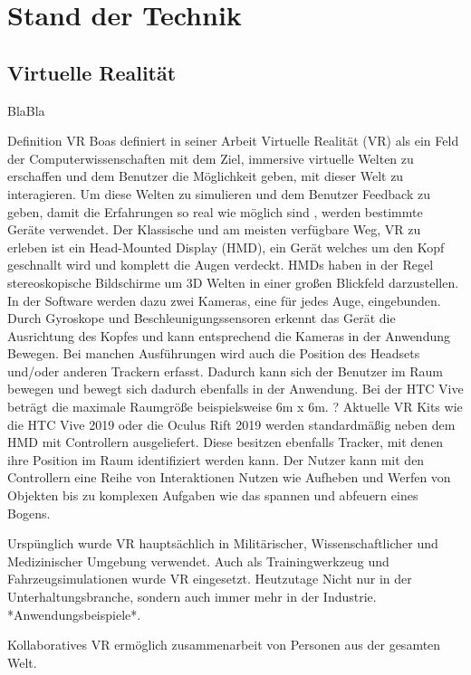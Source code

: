 \chapter{Stand der Technik}

\section{Virtuelle Realität}
BlaBla\cite{Dummer2009}

Definition VR
Boas definiert in  seiner Arbeit \cite{Boas2012} Virtuelle Realität (VR) als ein Feld der Computerwissenschaften mit dem Ziel, immersive virtuelle Welten zu erschaffen und dem Benutzer die Möglichkeit geben, mit dieser Welt zu interagieren. Um diese Welten zu simulieren und dem Benutzer Feedback zu geben, damit die Erfahrungen so real wie möglich sind , werden bestimmte Geräte verwendet.
Der Klassische und am meisten verfügbare Weg, VR zu erleben ist ein Head-Mounted Display (HMD), ein Gerät welches um den Kopf geschnallt wird und komplett die Augen verdeckt. HMDs haben in der Regel stereoskopische Bildschirme um 3D Welten in einer großen Blickfeld darzustellen. In der Software werden dazu zwei Kameras, eine für jedes Auge, eingebunden. Durch Gyroskope und Beschleunigungssensoren erkennt das Gerät die Ausrichtung des Kopfes und kann entsprechend die Kameras in der Anwendung Bewegen. Bei manchen Ausführungen wird auch die Position des Headsets und/oder anderen Trackern erfasst. Dadurch kann sich der Benutzer im Raum bewegen und bewegt sich dadurch ebenfalls in der Anwendung. \cite{Boas2012}\cite{Holloway1995} Bei der HTC Vive beträgt die maximale Raumgröße beispielsweise 6m x 6m. ?
Aktuelle VR Kits wie die HTC Vive 2019 oder die Oculus Rift 2019 werden standardmäßig neben dem HMD mit Controllern ausgeliefert. Diese besitzen ebenfalls Tracker, mit denen ihre Position im Raum identifiziert werden kann. Der Nutzer kann mit den Controllern eine Reihe von Interaktionen Nutzen wie Aufheben und Werfen von Objekten bis zu komplexen Aufgaben wie das spannen und abfeuern eines Bogens.

Urspünglich wurde VR hauptsächlich in Militärischer, Wissenschaftlicher und Medizinischer Umgebung verwendet. Auch als Trainingwerkzeug und Fahrzeugsimulationen wurde VR eingesetzt. Heutzutage 
 Nicht nur in der Unterhaltungsbranche, sondern auch immer mehr in der Industrie.\cite{Ragan2010} *Anwendungsbeispiele*.
 
Kollaboratives VR ermöglich zusammenarbeit von Personen aus der gesamten Welt.

